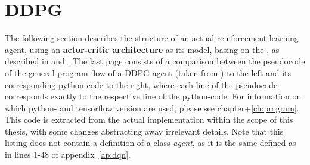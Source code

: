 \section{DDPG}
\label{ap:ddpg}

The following section describes the structure of an actual reinforcement learning agent, using an \textbf{actor-critic architecture} as its model, basing on the , as described in \cite{silver_deterministic_2014} and \cite{lillicrap_continuous_2015}. The last page consists of a comparison between the pseudocode of the general program flow of a DDPG-agent (taken from \cite{lillicrap_continuous_2015}) to the left and its corresponding python-code to the right, where each line of the pseudocode corresponds exactly to the respective line of the python-code. For information on which python- and tensorflow version are used, please see chapter+\ref{ch:program}. This code is extracted from the actual implementation within the scope of this thesis, with some changes abstracting away irrelevant details. Note that this listing does not contain a definition of a class \textit{agent}, as it is the same defined as in lines 1-48 of appendix~\ref{ap:dqn}.\\


\begin{landscape}
	\begin{parcolumns}[distance=0.1em,colwidths={1=33em}]{2}
		\label{ap:ddpg_comparison}
		\colchunk[1]{ }
		\colchunk[2]{  }
	\end{parcolumns}
\end{landscape}



